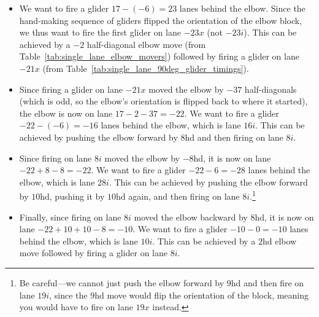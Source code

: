 \begin{itemize}
	\item We want to fire a glider $17 - (-6) = 23$ lanes behind the elbow. Since the hand-making sequence of gliders flipped the orientation of the elbow block, we thus want to fire the first glider on lane $-23x$ (not $-23i$). This can be achieved by a $-2$ half-diagonal elbow move (from Table~\ref{tab:single_lane_elbow_movers}) followed by firing a glider on lane $-21x$ (from Table~\ref{tab:single_lane_90deg_glider_timings}).\smallskip
	
	\item Since firing a glider on lane $-21x$ moved the elbow by $-37$ half-diagonals (which is odd, so the elbow's orientation is flipped back to where it started), the elbow is now on lane $17 - 2 - 37 = -22$. We want to fire a glider $-22 - (-6) = -16$ lanes behind the elbow, which is lane $16i$. This can be achieved by pushing the elbow forward by $8$hd and then firing on lane $8i$.\smallskip
	
	\item Since firing on lane $8i$ moved the elbow by $-8$hd, it is now on lane $-22 + 8 - 8 = -22$. We want to fire a glider $-22 - 6 = -28$ lanes behind the elbow, which is lane $28i$. This can be achieved by pushing the elbow forward by $10$hd, pushing it by $10$hd again, and then firing on lane $8i$.\footnote{Be careful---we cannot just push the elbow forward by $9$hd and then fire on lane $19i$, since the $9$hd move would flip the orientation of the block, meaning you would have to fire on lane $19x$ instead.}\smallskip
	
	\item Finally, since firing on lane $8i$ moved the elbow backward by $8$hd, it is now on lane $-22 + 10 + 10 - 8 = -10$. We want to fire a glider $-10 - 0 = -10$ lanes behind the elbow, which is lane $10i$. This can be achieved by a $2$hd elbow move followed by firing a glider on lane $8i$.\smallskip
\end{itemize}


